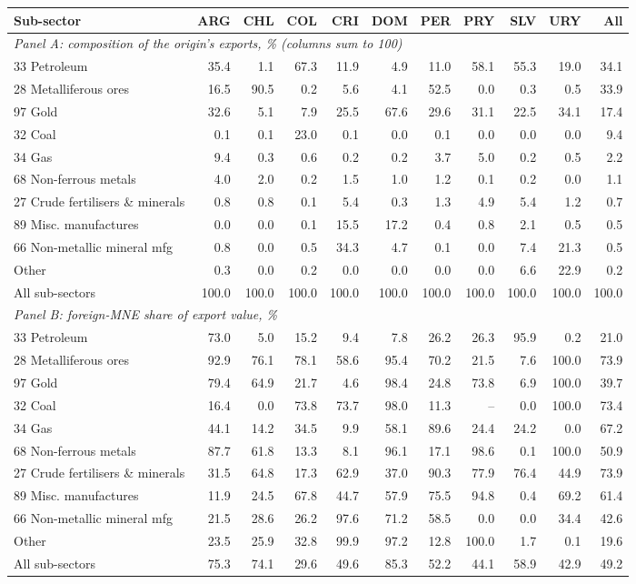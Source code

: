 \begin{tabular}{lrrrrrrrrrr}
\toprule
Sub-sector & ARG & CHL & COL & CRI & DOM & PER & PRY & SLV & URY & All \\
\midrule
\multicolumn{11}{l}{\textit{Panel A: composition of the origin's exports, \% (columns sum to 100)}} \\
33 Petroleum & 35.4 & 1.1 & 67.3 & 11.9 & 4.9 & 11.0 & 58.1 & 55.3 & 19.0 & 34.1 \\
28 Metalliferous ores & 16.5 & 90.5 & 0.2 & 5.6 & 4.1 & 52.5 & 0.0 & 0.3 & 0.5 & 33.9 \\
97 Gold & 32.6 & 5.1 & 7.9 & 25.5 & 67.6 & 29.6 & 31.1 & 22.5 & 34.1 & 17.4 \\
32 Coal & 0.1 & 0.1 & 23.0 & 0.1 & 0.0 & 0.1 & 0.0 & 0.0 & 0.0 & 9.4 \\
34 Gas & 9.4 & 0.3 & 0.6 & 0.2 & 0.2 & 3.7 & 5.0 & 0.2 & 0.5 & 2.2 \\
68 Non-ferrous metals & 4.0 & 2.0 & 0.2 & 1.5 & 1.0 & 1.2 & 0.1 & 0.2 & 0.0 & 1.1 \\
27 Crude fertilisers \& minerals & 0.8 & 0.8 & 0.1 & 5.4 & 0.3 & 1.3 & 4.9 & 5.4 & 1.2 & 0.7 \\
89 Misc. manufactures & 0.0 & 0.0 & 0.1 & 15.5 & 17.2 & 0.4 & 0.8 & 2.1 & 0.5 & 0.5 \\
66 Non-metallic mineral mfg & 0.8 & 0.0 & 0.5 & 34.3 & 4.7 & 0.1 & 0.0 & 7.4 & 21.3 & 0.5 \\
Other & 0.3 & 0.0 & 0.2 & 0.0 & 0.0 & 0.0 & 0.0 & 6.6 & 22.9 & 0.2 \\
All sub-sectors & 100.0 & 100.0 & 100.0 & 100.0 & 100.0 & 100.0 & 100.0 & 100.0 & 100.0 & 100.0 \\
\midrule
\multicolumn{11}{l}{\textit{Panel B: foreign-MNE share of export value, \%}} \\
33 Petroleum & 73.0 & 5.0 & 15.2 & 9.4 & 7.8 & 26.2 & 26.3 & 95.9 & 0.2 & 21.0 \\
28 Metalliferous ores & 92.9 & 76.1 & 78.1 & 58.6 & 95.4 & 70.2 & 21.5 & 7.6 & 100.0 & 73.9 \\
97 Gold & 79.4 & 64.9 & 21.7 & 4.6 & 98.4 & 24.8 & 73.8 & 6.9 & 100.0 & 39.7 \\
32 Coal & 16.4 & 0.0 & 73.8 & 73.7 & 98.0 & 11.3 & -- & 0.0 & 100.0 & 73.4 \\
34 Gas & 44.1 & 14.2 & 34.5 & 9.9 & 58.1 & 89.6 & 24.4 & 24.2 & 0.0 & 67.2 \\
68 Non-ferrous metals & 87.7 & 61.8 & 13.3 & 8.1 & 96.1 & 17.1 & 98.6 & 0.1 & 100.0 & 50.9 \\
27 Crude fertilisers \& minerals & 31.5 & 64.8 & 17.3 & 62.9 & 37.0 & 90.3 & 77.9 & 76.4 & 44.9 & 73.9 \\
89 Misc. manufactures & 11.9 & 24.5 & 67.8 & 44.7 & 57.9 & 75.5 & 94.8 & 0.4 & 69.2 & 61.4 \\
66 Non-metallic mineral mfg & 21.5 & 28.6 & 26.2 & 97.6 & 71.2 & 58.5 & 0.0 & 0.0 & 34.4 & 42.6 \\
Other & 23.5 & 25.9 & 32.8 & 99.9 & 97.2 & 12.8 & 100.0 & 1.7 & 0.1 & 19.6 \\
All sub-sectors & 75.3 & 74.1 & 29.6 & 49.6 & 85.3 & 52.2 & 44.1 & 58.9 & 42.9 & 49.2 \\
\bottomrule
\end{tabular}
